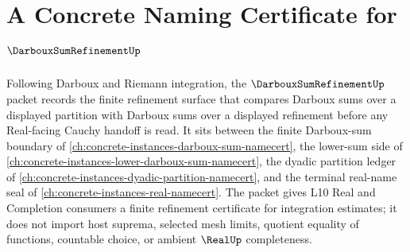 \chapter{A Concrete Naming Certificate for $\DarbouxSumRefinementUp$}
\label{ch:concrete-instances-darboux-sum-refinement-namecert}

Following Darboux and Riemann integration, the $\DarbouxSumRefinementUp$ packet records the finite refinement surface that compares Darboux sums over a displayed partition with Darboux sums over a displayed refinement before any Real-facing Cauchy handoff is read. It sits between the finite Darboux-sum boundary of \autoref{ch:concrete-instances-darboux-sum-namecert}, the lower-sum side of \autoref{ch:concrete-instances-lower-darboux-sum-namecert}, the dyadic partition ledger of \autoref{ch:concrete-instances-dyadic-partition-namecert}, and the terminal real-name seal of \autoref{ch:concrete-instances-real-namecert}. The packet gives L10 Real and Completion consumers a finite refinement certificate for integration estimates; it does not import host suprema, selected mesh limits, quotient equality of functions, countable choice, or ambient $\RealUp$ completeness.

